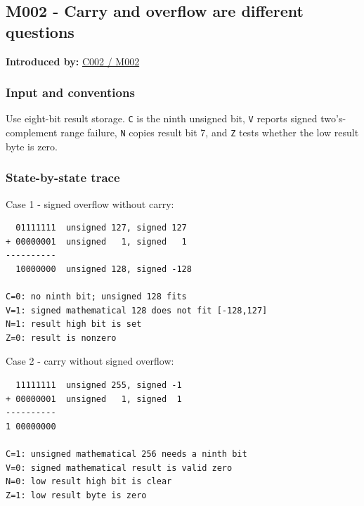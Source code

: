 \subsection{M002 - Carry and overflow are different questions}\label{appendix-92ff77d4dfdc-m002---carry-and-overflow-are-different-questions}

\hypertarget{appendix-92ff77d4dfdc-m002---carry-and-overflow-are-different-questions}{}

\textbf{Introduced by:} \hyperref[01-foundations-i-ch001-arithmetic-becomes-a-policy]{C002 / M002}

\subsubsection{Input and conventions}\label{appendix-92ff77d4dfdc-input-and-conventions-1}

\hypertarget{appendix-92ff77d4dfdc-input-and-conventions-1}{}

Use eight-bit result storage. \texttt{C} is the ninth unsigned bit, \texttt{V} reports signed two's-complement range failure, \texttt{N} copies result bit 7, and \texttt{Z} tests whether the low result byte is zero.

\subsubsection{State-by-state trace}\label{appendix-92ff77d4dfdc-state-by-state-trace-1}

\hypertarget{appendix-92ff77d4dfdc-state-by-state-trace-1}{}

Case 1 - signed overflow without carry:

\begin{verbatim}
  01111111  unsigned 127, signed 127
+ 00000001  unsigned   1, signed   1
----------
  10000000  unsigned 128, signed -128

C=0: no ninth bit; unsigned 128 fits
V=1: signed mathematical 128 does not fit [-128,127]
N=1: result high bit is set
Z=0: result is nonzero
\end{verbatim}

Case 2 - carry without signed overflow:

\begin{verbatim}
  11111111  unsigned 255, signed -1
+ 00000001  unsigned   1, signed  1
----------
1 00000000

C=1: unsigned mathematical 256 needs a ninth bit
V=0: signed mathematical result is valid zero
N=0: low result high bit is clear
Z=1: low result byte is zero
\end{verbatim}

